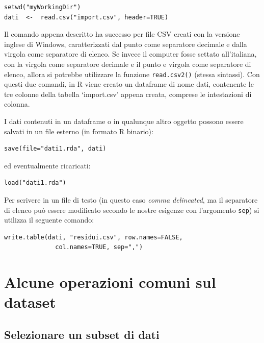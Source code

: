 \documentclass[a4paper,12pt,oneside]{book}
\theoremstyle{definition}
\theoremstyle{definition}
\theoremstyle{definition}
\theoremstyle{remark}
\begin{document}
\begin{verbatim}
setwd("myWorkingDir")
dati  <-  read.csv("import.csv", header=TRUE)
\end{verbatim}

Il comando appena descritto ha successo per file CSV creati con la
versione inglese di Windows, caratterizzati dal punto come separatore
decimale e dalla virgola come separatore di elenco. Se invece il
computer fosse settato all'italiana, con la virgola come separatore
decimale e il punto e virgola come separatore di elenco, allora si
potrebbe utilizzare la funzione \texttt{read.csv2()} (stessa sintassi).
Con questi due comandi, in R viene creato un dataframe di nome dati,
contenente le tre colonne della tabella `import.csv' appena creata,
comprese le intestazioni di colonna.

I dati contenuti in un dataframe o in qualunque altro oggetto possono
essere salvati in un file esterno (in formato R binario):

\begin{verbatim}
save(file="dati1.rda", dati)
\end{verbatim}

ed eventualmente ricaricati:

\begin{verbatim}
load("dati1.rda")
\end{verbatim}

Per scrivere in un file di testo (in questo caso \emph{comma
delineated}, ma il separatore di elenco può essere modificato secondo le
nostre esigenze con l'argomento \texttt{sep}) si utilizza il seguente
comando:

\begin{verbatim}
write.table(dati, "residui.csv", row.names=FALSE, 
              col.names=TRUE, sep=",")
\end{verbatim}

\section*{Alcune operazioni comuni sul
dataset}\label{alcune-operazioni-comuni-sul-dataset}

\subsection*{Selezionare un subset di
dati}\label{selezionare-un-subset-di-dati}
\end{document}
